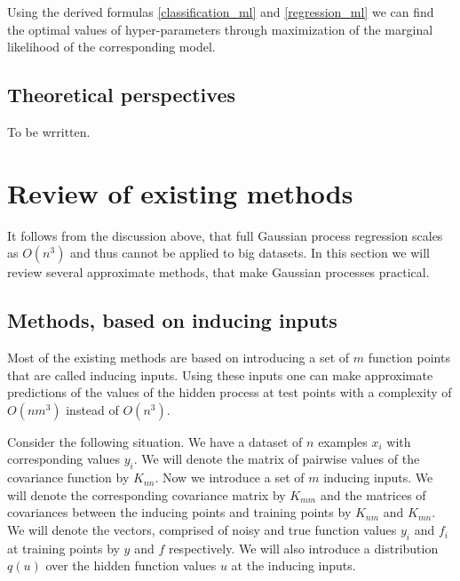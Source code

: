 \documentclass[12pt]{article}
\begin{document}
	Using the derived formulas \ref{classification_ml} and \ref{regression_ml} we can find the optimal values of hyper-parameters through maximization of the marginal likelihood of the corresponding model.
	
\subsection{Theoretical perspectives}
	\hspace{0.6cm}To be wrritten.

\pagebreak
\section{Review of existing methods}

\hspace{0.6cm}It follows from the discussion above, that full Gaussian process regression scales as $O(n^3)$ and thus cannot be applied to big datasets. In this section we will review several approximate methods, that make Gaussian processes practical.

\subsection{Methods, based on inducing inputs}
	\hspace{0.6cm}Most of the existing methods are based on introducing a set of $m$ function points that are called inducing inputs. Using these inputs one can make approximate predictions of the values of the hidden process at test points with a complexity of $O(nm^3)$ instead of $O(n^3)$.
	
	Consider the following situation. We have a dataset of $n$ examples $x_i$ with corresponding values $y_i$. We will denote the matrix of pairwise values of the covariance function by $K_{nn}$. Now we introduce a set of $m$ inducing inputs. We will denote the corresponding covariance matrix by $K_{mm}$ and the matrices of covariances between the inducing points and training points by $K_{nm}$ and $K_{mn}$. We will denote the vectors, comprised of noisy and true function values $y_i$ and $f_i$ at training points by $y$ and $f$ respectively. We will also introduce a distribution $q(u)$ over the hidden function values $u$ at the inducing inputs.
	
	
\end{document}
